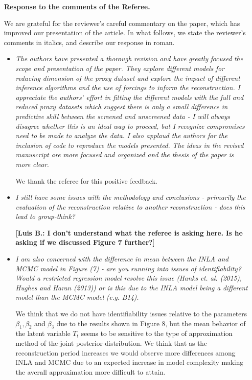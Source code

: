 \documentclass[11pt]{article}
\newcommand{\lb}[1]{\color{ForestGreen}\textbf{[Luis B.: #1]}\normalcolor}
\begin{document}
\begin{center}
  {\Large \textbf{Response to the comments of the Referee.}}
\end{center}

We are grateful for the reviewer's careful commentary on the paper, which has improved
our presentation of the article. In what follows, we state the reviewer's
comments in italics, and describe our response in roman.

\begin{itemize}
  
\item \textit{The authors have presented a thorough revision and have greatly
    focused the scope and presentation of the paper. They explore different
    models for reducing dimension of the proxy dataset and explore the impact of
    different inference algorithms and the use of forcings to inform the
    reconstruction. I appreciate the authors’ effort in fitting the different
    models with the full and reduced proxy datasets which suggest there is only
    a small difference in predictive skill between the screened and unscreened
    data - I will always disagree whether this is an ideal way to proceed, but I
    recognize compromises need to be made to analyze the data. I also applaud
    the authors for the inclusion of code to reproduce the models presented. The
    ideas in the revised manuscript are more focused and organized and the thesis of the paper is more clear.
}

We thank the referee for this positive feedback. 
\item \textit{I still have some issues with the methodology and conclusions -
    primarily the evaluation of the reconstruction relative to another
    reconstruction - does this lead to group-think?}

\lb{I don't understand what the referee is asking here. Is he asking if we
  discussed Figure 7 further?}
  
\item \textit{I am also concerned with the
    difference in mean between the INLA and MCMC model in Figure (7) - are you
    running into issues of identifiability? Would a restricted regression model
    resolve this issue (Hanks et. al. (2015), Hughes and Haran (2013)) or is
    this due to the INLA model being a different model than the MCMC model (e.g.
    B14).}

We think that we do not have identifiability issues relative to the parameters
\(\beta_1,\beta_2\) and \(\beta_3\) due to the results shown in Figure 8, but
the mean behavior of the latent variable
\(T_t\) seems to be sensitive to the type of approximation method of the
joint posterior distribution. We
think that as the reconstruction period increases we would observe more
differences among INLA and MCMC due to an expected increase in model complexity
making the averall approximation more difficult to attain.  
  

\end{itemize}
\end{document}
